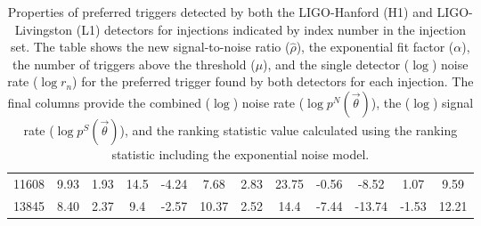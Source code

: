 \begin{table}[ht]
\begin{tabular}{lccccccccccc}
        11608 & 9.93 & 1.93 & 14.5 & -4.24 & 7.68 & 2.83 & 23.75 & -0.56 & -8.52 & 1.07 & 9.59 \\
        13845 & 8.40 & 2.37 & 9.4 & -2.57 & 10.37 & 2.52 & 14.4 & -7.44 & -13.74 & -1.53 & 12.21 \\
        \bottomrule
    \end{tabular}
    \caption{Properties of preferred triggers detected by both the LIGO-Hanford (H1) and LIGO-Livingston (L1) detectors for injections indicated by index number in the injection set. The table shows the new signal-to-noise ratio ($\hat{\rho}$), the exponential fit factor ($\alpha$), the number of triggers above the threshold ($\mu$), and the single detector ($\log$) noise rate ($\log r_n$) for the preferred trigger found by both detectors for each injection. The final columns provide the combined ($\log$) noise rate ($\log p^{N}(\Vec{\theta})$), the ($\log$) signal rate ($\log p^{S}(\Vec{\theta})$), and the ranking statistic value calculated using the ranking statistic including the exponential noise model.}
    \label{5:tab:top-right-same-trigs-fits}
\end{table}
%


